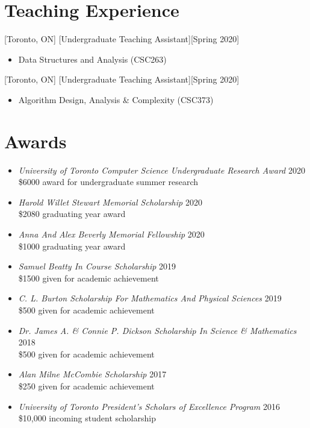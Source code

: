 \documentclass{article}
\begin{document}
    \section{Teaching Experience}
    [Toronto, ON]
    [Undergraduate Teaching Assistant][Spring 2020]
    \begin{itemize}
        \item Data Structures and Analysis (CSC263)
    \end{itemize}

    [Toronto, ON]
    [Undergraduate Teaching Assistant][Spring 2020]
    \begin{itemize}
        \item Algorithm Design, Analysis \& Complexity (CSC373)
    \end{itemize}


    \section{Awards}
    \begin{itemize}
        \setlength\itemsep{.7ex}
        \item \textsl{University of Toronto Computer Science Undergraduate Research Award} \hfill 2020\\
        \$6000 award for undergraduate summer research
        \item \textsl{Harold Willet Stewart Memorial Scholarship} \hfill 2020\\
        \$2080 graduating year award
        \item \textsl{Anna And Alex Beverly Memorial Fellowship} \hfill 2020\\
        \$1000 graduating year award
        \item \textsl{Samuel Beatty In Course Scholarship} \hfill 2019\\
        \$1500 given for academic achievement
        \item \textsl{C. L. Burton Scholarship For Mathematics And Physical Sciences} \hfill 2019\\
        \$500 given for academic achievement
        \item \textsl{Dr. James A. \& Connie P. Dickson Scholarship In Science \& Mathematics} \hfill 2018\\
        \$500 given for academic achievement
        \item \textsl{Alan Milne McCombie Scholarship} \hfill 2017\\
        \$250 given for academic achievement
        \item \textsl{University of Toronto President's Scholars of Excellence Program} \hfill 2016\\
        \$10,000 incoming student scholarship
    \end{itemize}
\end{document}
